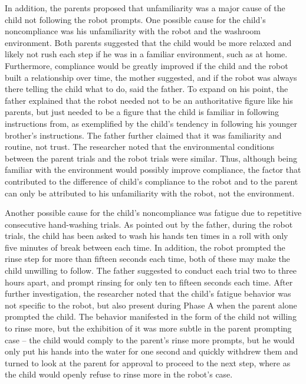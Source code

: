 In addition, the parents proposed that unfamiliarity was a major cause of the child not following the robot prompts.  One possible cause for the child's noncompliance was his unfamiliarity with the robot and the washroom environment.  Both parents suggested that the child would be more relaxed and likely not rush each step if he was in a familiar environment, such as at home.  Furthermore, compliance would be greatly improved if the child and the robot built a relationship over time, the mother suggested, and if the robot was always there telling the child what to do, said the father.  To expand on his point, the father explained that the robot needed not to be an authoritative figure like his parents, but just needed to be a figure that the child is familiar in following instructions from, as exemplified by the child's tendency in following his younger brother's instructions.  The father further claimed that it was familiarity and routine, not trust.  The researcher noted that the environmental conditions between the parent trials and the robot trials were similar.  Thus, although being familiar with the environment would possibly improve compliance, the factor that contributed to the difference of child's compliance to the robot and to the parent can only be attributed to his unfamiliarity with the robot, not the environment.

Another possible cause for the child's noncompliance was fatigue due to repetitive consecutive hand-washing trials.  As pointed out by the father, during the robot trials, the child has been asked to wash his hands ten times in a roll with only five minutes of break between each time.  In addition, the robot prompted the rinse step for more than fifteen seconds each time, both of these may make the child unwilling to follow.  The father suggested to conduct each trial two to three hours apart, and prompt rinsing for only ten to fifteen seconds each time.  After further investigation, the researcher noted that the child's fatigue behavior was not specific to the robot, but also present during Phase A when the parent alone prompted the child.  The behavior manifested in the form of the child not willing to rinse more, but the exhibition of it was more subtle in the parent prompting case -- the child would comply to the parent's rinse more prompts, but he would only put his hands into the water for one second and quickly withdrew them and turned to look at the parent for approval to proceed to the next step, where as the child would openly refuse to rinse more in the robot's case.

